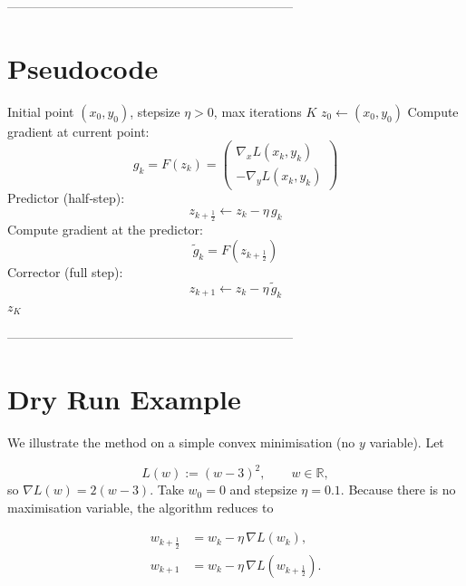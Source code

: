 \documentclass{article}
\newcommand{\R}{\mathbb{R}}
\newcommand{\grad}{\nabla}
\begin{document}
--------------------------------------------------------------------
\section*{Pseudocode}
\begin{algorithm}[H]
\caption{Extra‑Gradient for \(\min_{x}\max_{y}L(x,y)\)}
\begin{algorithmic}[1]
\Require Initial point \((x_{0},y_{0})\), stepsize \(\eta>0\), max iterations \(K\)
\State \(z_{0}\gets (x_{0},y_{0})\)
    \State Compute gradient at current point:
    \[
    g_{k}=F(z_{k})=
    \begin{pmatrix}
    \grad_{x}L(x_{k},y_{k})\\[1mm]
    -\grad_{y}L(x_{k},y_{k})
    \end{pmatrix}
    \]
    \State Predictor (half‑step):
    \[
    z_{k+\frac12}\gets z_{k}-\eta\,g_{k}
    \]
    \State Compute gradient at the predictor:
    \[
    \tilde g_{k}=F(z_{k+\frac12})
    \]
    \State Corrector (full step):
    \[
    z_{k+1}\gets z_{k}-\eta\,\tilde g_{k}
    \]
\EndFor
\State \Return \(z_{K}\)
\end{algorithmic}
\end{algorithm}

--------------------------------------------------------------------
\section*{Dry Run Example}
We illustrate the method on a simple convex minimisation (no \(y\) variable).  
Let  

\[
L(w):=(w-3)^{2},\qquad w\in\R,
\]
so \(\grad L(w)=2(w-3)\).  
Take \(w_{0}=0\) and stepsize \(\eta=0.1\).  
Because there is no maximisation variable, the algorithm reduces to  

\[
\begin{aligned}
w_{k+\frac12}&=w_{k}-\eta\,\grad L(w_{k}),\\
w_{k+1}&=w_{k}-\eta\,\grad L(w_{k+\frac12}).
\end{aligned}
\]
\end{document}
